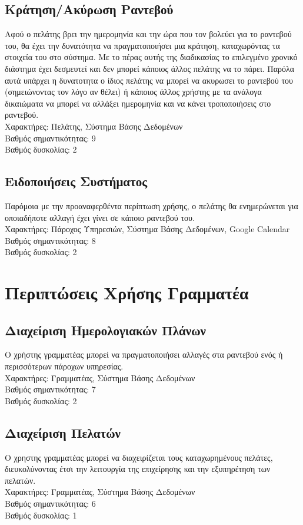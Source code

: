 \documentclass[12pt]{article}
\begin{document}
\subsection{Κράτηση/Ακύρωση Ραντεβού}
Αφού ο πελάτης βρει την ημερομηνία και την ώρα που τον βολεύει για το ραντεβού του, θα έχει την δυνατότητα να πραγματοποιήσει μια κράτηση, καταχωρόντας τα στοιχεία του στο σύστημα. Με το πέρας αυτής της διαδικασίας το επιλεγμένο χρονικό διάστημα έχει δεσμευτεί και δεν μπορεί κάποιος άλλος πελάτης να το πάρει. Παρόλα αυτά υπάρχει η δυνατοτητα ο ίδιος πελάτης να μπορεί να ακυρωσει το ραντεβού του (σημειώνοντας τον λόγο αν θέλει) ή κάποιος άλλος χρήστης με τα ανάλογα δικαιώματα να μπορεί να αλλάξει ημερομηνία και να κάνει τροποποιήσεις στο ραντεβού. 
\\[0.3cm] 
Χαρακτήρες: Πελάτης, Σύστημα Βάσης Δεδομένων
\\[0.3cm]
Βαθμός σημαντικότητας: 9
\\[0.3cm]
Βαθμός δυσκολίας: 2

\subsection{Ειδοποιήσεις Συστήματος}
Παρόμοια με την προαναφερθέντα περίπτωση χρήσης, ο πελάτης θα ενημερώνεται για οποιαδήποτε αλλαγή έχει γίνει σε κάποιο ραντεβού του. 
\\[0.3cm] 
Χαρακτήρες: Πάροχος Υπηρεσιών, Σύστημα Βάσης Δεδομένων, Google Calendar
\\[0.3cm]
Βαθμός σημαντικότητας: 8
\\[0.3cm]
Βαθμός δυσκολίας: 2

\section {Περιπτώσεις Χρήσης Γραμματέα}
\subsection{Διαχείριση Ημερολογιακών Πλάνων}
Ο χρήστης γραμματέας μπορεί να πραγματοποιήσει αλλαγές στα ραντεβού ενός ή περισσότερων πάροχων υπηρεσίας. 
\\[0.3cm] 
Χαρακτήρες: Γραμματέας, Σύστημα Βάσης Δεδομένων
\\[0.3cm]
Βαθμός σημαντικότητας: 7
\\[0.3cm]
Βαθμός δυσκολίας: 2

\subsection{Διαχείριση Πελατών}
Ο χρηστης γραμματέας μπορεί να διαχειρίζεται τους καταχωρημένους πελάτες, διευκολύνοντας έτσι την λειτουργία της επιχείρησης και την εξυπηρέτηση των πελατών.
\\[0.3cm] 
Χαρακτήρες: Γραμματέας, Σύστημα Βάσης Δεδομένων
\\[0.3cm]
Βαθμός σημαντικότητας: 6
\\[0.3cm]
Βαθμός δυσκολίας: 1
\end{document}
